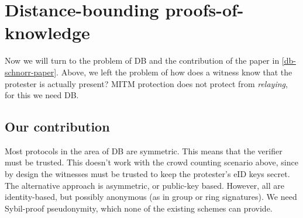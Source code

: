 
\section{Distance-bounding proofs-of-knowledge}

Now we will turn to the problem of \ac{DB} and the contribution of the paper in 
\cref{db-schnorr-paper}.
Above, we left the problem of how does a witness know that the protester is 
actually present?
\Ac{MITM} protection does not protect from \emph{relaying}, for this we need 
\ac{DB}.

\subsection{Our contribution}

Most protocols in the area of \acl{DB} are symmetric.
This means that the verifier must be trusted.
This doesn't work with the crowd counting scenario above, since by design the 
witnesses must be trusted to keep the protester's \ac{eID} keys secret.
The alternative approach is asymmetric, or public-key based.
However, all are identity-based, but possibly anonymous (as in group or ring 
signatures).
We need Sybil-proof pseudonymity, which none of the existing schemes can 
provide.

